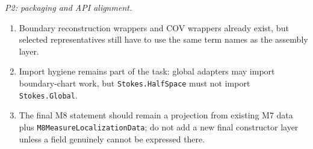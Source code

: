 \begin{remark}
  \emph{P2: packaging and API alignment.}
  \begin{enumerate}
    \item Boundary reconstruction wrappers and COV wrappers already exist, but
      selected representatives still have to use the same term names as the
      assembly layer.
    \item Import hygiene remains part of the task: global adapters may import
      boundary-chart work, but \texttt{Stokes.HalfSpace} must not import
      \texttt{Stokes.Global}.
    \item The final M8 statement should remain a projection from existing M7
      data plus \texttt{M8MeasureLocalizationData}; do not add a new final
      constructor layer unless a field genuinely cannot be expressed there.
  \end{enumerate}
  \par\endgroup
\end{remark}

